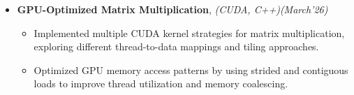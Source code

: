 \documentclass[a4paper,10pt]{article}
\begin{document}
\begin{itemize}
\item \textbf{GPU-Optimized Matrix Multiplication}, \emph{(CUDA, C++)}\hfill \emph{(March'26)}
\begin{itemize}
    \item Implemented multiple CUDA kernel strategies for matrix multiplication, exploring different thread-to-data mappings and tiling approaches.
    \item Optimized GPU memory access patterns by using strided and contiguous loads to improve thread utilization and memory coalescing.
\end{itemize}

\end{itemize}



\end{document}
